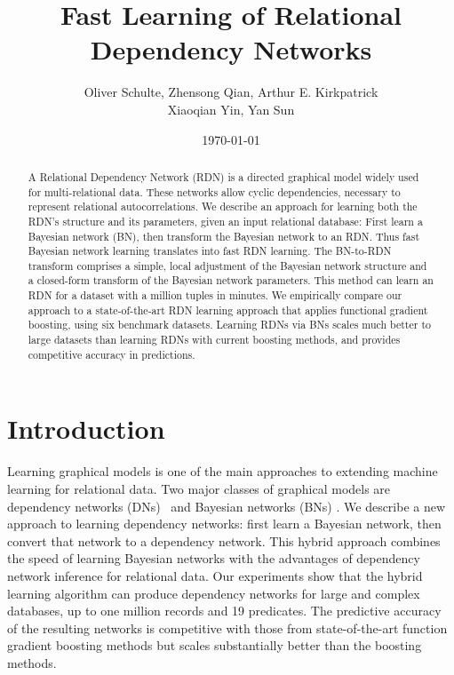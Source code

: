 \documentclass[runningheads,a4paper]{llncs}
\title{Fast Learning of Relational Dependency Networks}
\author{Oliver Schulte, Zhensong Qian, Arthur E. Kirkpatrick\\ Xiaoqian Yin, Yan Sun 
}
\institute{ School of Computing Science, Simon Fraser University, Canada\\
\{oschulte,zqian,ted,xiaoqian\_yin,sunyans\}@sfu.ca\\}
\date{\today}
\begin{document}
\maketitle



\begin{abstract} 
A Relational Dependency Network (RDN) is a directed graphical model widely used for multi-relational data. These networks allow cyclic dependencies, necessary to represent relational autocorrelations. We describe an approach for learning both the RDN's structure and its parameters, given an input relational database: First learn a Bayesian network (BN), then transform the Bayesian network to an RDN. Thus fast Bayesian network  learning translates into fast RDN learning. The BN-to-RDN transform comprises a simple, local adjustment of the Bayesian network  structure and a closed-form transform of the Bayesian network  parameters. This method can learn an RDN for a dataset with a million tuples in minutes. We empirically compare our approach to a state-of-the-art RDN learning approach that applies functional gradient boosting, using six benchmark datasets. Learning RDNs via BNs scales much better to large datasets than learning RDNs with current boosting methods, and provides competitive accuracy in predictions.\end{abstract}


\section{Introduction} \label{sec:intro} Learning graphical models is one of the main approaches to extending machine learning for relational data. 
Two major classes of graphical models are dependency networks (DNs)~\cite{Heckerman2000} and Bayesian networks (BNs) \cite{Pearl1988}. We describe a new approach to learning dependency networks: first learn a Bayesian network, then convert that network to a dependency network. 
This hybrid approach combines the speed of learning Bayesian networks with the advantages of dependency network inference for relational data.
Our experiments show that the hybrid learning algorithm can produce dependency networks for large and complex databases, up to one million records and 19 predicates. The predictive accuracy of the resulting networks is competitive with those from state-of-the-art function gradient boosting methods
but scales substantially better than the boosting methods.
%
\end{document}
